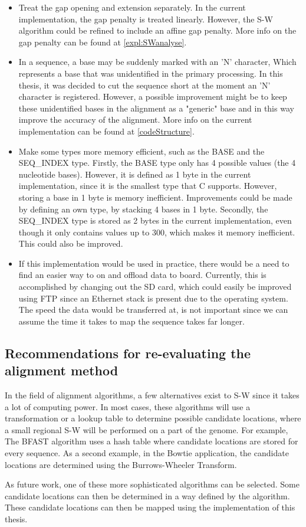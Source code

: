 \begin{itemize}
	\item Treat the gap opening and extension separately. In the current implementation, the gap penalty is treated linearly. However, the S-W algorithm could be refined to include an affine gap penalty. More info on the gap penalty can be found at \ref{expl:SWanalyse}.
	\item In a sequence, a base may be suddenly marked with an 'N' character, Which represents a base that was unidentified in the primary processing. In this thesis, it was decided to cut the sequence short at the moment an 'N' character is registered. However, a possible improvement might be to keep these unidentified bases in the alignment as a "generic" base and in this way improve the accuracy of the alignment. More info on the current implementation can be found at \ref{codeStructure}.
	\item Make some types more memory efficient, such as the BASE and the SEQ\_INDEX type. Firstly, the BASE type only has 4 possible values (the 4 nucleotide bases). However, it is defined as 1 byte in the current implementation, since it is the smallest type that C supports. However, storing a base in 1 byte is memory inefficient. Improvements could be made by defining an own type, by stacking 4 bases in 1 byte. Secondly, the SEQ\_INDEX type is stored as 2 bytes in the current implementation, even though it only contains values up to 300, which makes it memory inefficient. This could also be improved.
	\item If this implementation would be used in practice, there would be a need to find an easier way to on and offload data to board. Currently,  this is accomplished by changing out the SD card, which could easily be improved using FTP since an Ethernet stack is present due to the operating system. The speed the data would be transferred at, is not important since we can assume the time it takes to map the sequence takes far longer. 
\end{itemize}

\subsection{Recommendations for re-evaluating the alignment method}

In the field of alignment algorithms, a few alternatives exist to S-W since it takes a lot of computing power. In most cases, these algorithms will use a transformation or a lookup table to determine possible candidate locations, where a small regional S-W will be performed on a part of the genome. For example, The BFAST algorithm uses a hash table where candidate locations are stored for every sequence. As a second example, in the Bowtie application, the candidate locations are determined using the Burrows-Wheeler Transform.

As future work, one of these more sophisticated algorithms can be selected. Some candidate locations can then be determined in a way defined by the algorithm. These candidate locations can then be mapped using the implementation of this thesis.